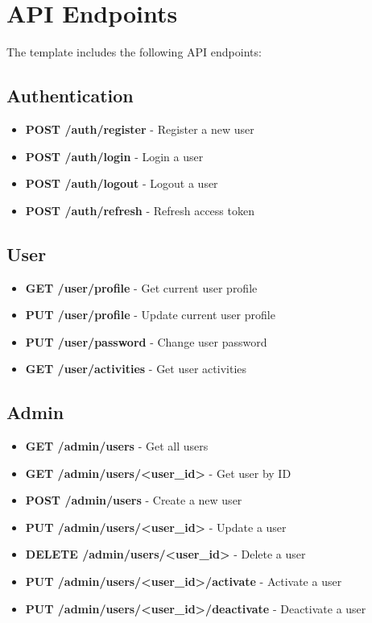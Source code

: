 \documentclass{article}
\begin{document}
\section{API Endpoints}

The template includes the following API endpoints:

\subsection{Authentication}

\begin{itemize}
    \item \textbf{POST /auth/register} - Register a new user
    \item \textbf{POST /auth/login} - Login a user
    \item \textbf{POST /auth/logout} - Logout a user
    \item \textbf{POST /auth/refresh} - Refresh access token
\end{itemize}

\subsection{User}

\begin{itemize}
    \item \textbf{GET /user/profile} - Get current user profile
    \item \textbf{PUT /user/profile} - Update current user profile
    \item \textbf{PUT /user/password} - Change user password
    \item \textbf{GET /user/activities} - Get user activities
\end{itemize}

\subsection{Admin}

\begin{itemize}
    \item \textbf{GET /admin/users} - Get all users
    \item \textbf{GET /admin/users/<user\_id>} - Get user by ID
    \item \textbf{POST /admin/users} - Create a new user
    \item \textbf{PUT /admin/users/<user\_id>} - Update a user
    \item \textbf{DELETE /admin/users/<user\_id>} - Delete a user
    \item \textbf{PUT /admin/users/<user\_id>/activate} - Activate a user
    \item \textbf{PUT /admin/users/<user\_id>/deactivate} - Deactivate a user
\end{itemize}
\end{document}

